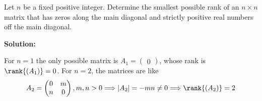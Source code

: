 \documentclass[../../main.tex]{subfiles}
\begin{document}
  \begin{shaded}
    Let $n$ be a fixed positive integer. Determine the smallest possible rank of an $n \times n$ matrix that has zeros along the main diagonal and strictly positive real numbers off the main diagonal.
  \end{shaded}

  \textbf{Solution:}

  For $n = 1$ the only possible matrix is $A_1 = \begin{pmatrix} 0 \end{pmatrix}$, whose rank is $\rank{(A_1)} = 0$. For $n = 2$, the matrices are like
  $$
  A_2 = \begin{pmatrix} 0 & m \\ n & 0 \end{pmatrix}, m, n > 0 \Longrightarrow |A_2| = -m n \ne 0 \Longrightarrow \rank{(A_2)} = 2
  $$
\end{document}

